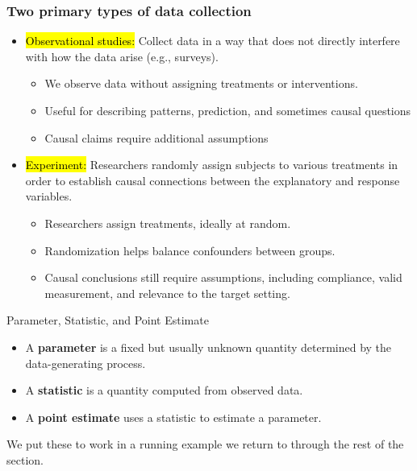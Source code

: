 \documentclass[slidestop,compress,mathserif]{beamer}
\begin{document}
\begin{frame}
\frametitle{Two primary types of data collection}

\begin{itemize}

\item \hl{Observational studies:} Collect data in a way that does not directly interfere with how the data arise (e.g., surveys).
\begin{itemize}
\item We observe data without assigning treatments or interventions.
\item Useful for describing patterns, prediction, and sometimes causal questions
\item Causal claims require additional assumptions
\end{itemize}

\pause

\item \hl{Experiment:} Researchers randomly assign subjects to various treatments in order to establish causal connections between the explanatory and response variables.
\begin{itemize}
\item Researchers assign treatments, ideally at random.
\item Randomization helps balance confounders between groups.
\item Causal conclusions still require assumptions, including compliance, valid measurement, and relevance to the target setting.
\end{itemize}


\end{itemize}

\end{frame}






\begin{frame}{Parameter, Statistic, and Point Estimate}

\begin{itemize}
  \item A \textbf{parameter} is a fixed but usually unknown quantity determined by the data-generating process.
  \item A \textbf{statistic} is a quantity computed from observed data.
  \item A \textbf{point estimate} uses a statistic to estimate a parameter.
\end{itemize}

\vspace{0.4em}
We put these to work in a running example we return to through the rest of the section.

\end{frame}
\end{document}
